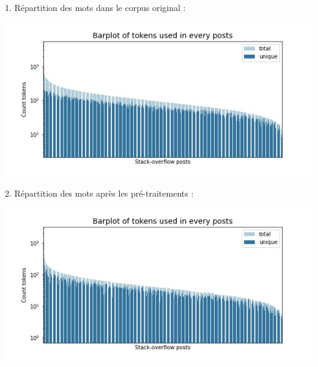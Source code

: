 \documentclass[a4paper,11pt]{article}
\begin{document}
{\small 
\begin{minipage}{0.48\linewidth}
    1. Répartition des mots dans le corpus original :%
    \begin{center}
        \includegraphics[width=\linewidth]{figures/barplot_tokens1.jpg}
    \end{center}
\end{minipage}
\hfill
\begin{minipage}{0.48\linewidth}
    2. Répartition des mots après les pré-traitements :
    \begin{center}
        \includegraphics[width=\linewidth]{figures/barplot_tokens3_radical.jpg}
    \end{center}
\end{minipage}
}\\
\end{document}

